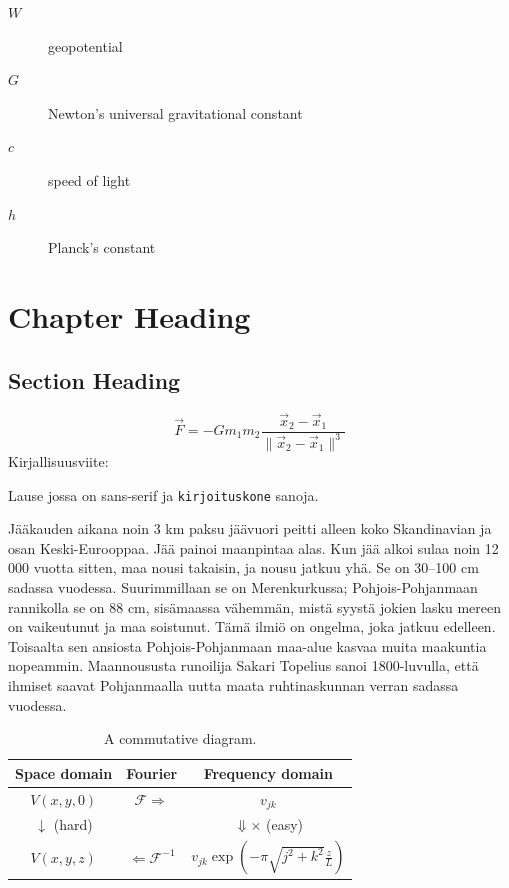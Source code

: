 \documentclass[dissertation,math,vertlayout,pdfa,colorlinks,nologo]{aaltoseries}
\begin{document}
\symbols

\begin{description}
\item[$W$] geopotential
\item[$G$] Newton's universal gravitational constant
\item[$c$] speed of light
\item[$h$] Planck's constant
\end{description}


\chapter{Chapter Heading}
\section{Section Heading}
\[
\vec{F}=-G m_1 m_2 \frac{\vec{x}_2-\vec{x}_1}{\lVert{\vec{x}_2-\vec{x}_1}\rVert^3}
\]
\lipsum[1-2]
Kirjallisuusviite: \cite{Knuth1984:The-TeXbook}

Lause jossa on \textsf{sans-serif} ja \texttt{kirjoituskone} sanoja.

Jääkauden aikana noin 3 km paksu jäävuori peitti alleen koko Skandinavian ja
osan Keski-Eurooppaa. Jää painoi maanpintaa alas. Kun jää alkoi sulaa noin 12
000 vuotta sitten, maa nousi takaisin, ja nousu jatkuu yhä. Se on 30–100 cm
sadassa vuodessa. Suurimmillaan se on Merenkurkussa; Pohjois-Pohjanmaan
rannikolla se on 88 cm, sisämaassa vähemmän, mistä syystä jokien lasku mereen
on vaikeutunut ja maa soistunut. Tämä ilmiö on ongelma, joka jatkuu edelleen.
Toisaalta sen ansiosta Pohjois-Pohjanmaan maa-alue kasvaa muita maakuntia
nopeammin. Maannoususta runoilija Sakari Topelius sanoi 1800-luvulla, että
ihmiset saavat Pohjanmaalla uutta maata ruhtinaskunnan verran sadassa vuodessa.

\begin{table}
\caption{A commutative diagram.}
\begin{tabular}{ccc}
\hline
Space domain & Fourier & Frequency domain\tabularnewline
\hline
$V\left(x,y,0\right)$ & $\mathcal{F}\Longrightarrow$ & $v_{jk}$\tabularnewline
$\downarrow$ (hard) &  & $\Downarrow\times$ (easy)\tabularnewline
$V\left(x,y,z\right)$ & $\Longleftarrow\mathcal{F}^{-1}$ & $v_{jk}\exp\left(-\pi\sqrt{j^{2}+k^{2}}\frac{z}{L}\right)$\tabularnewline
\hline
\end{tabular}
\end{table}
\end{document}
